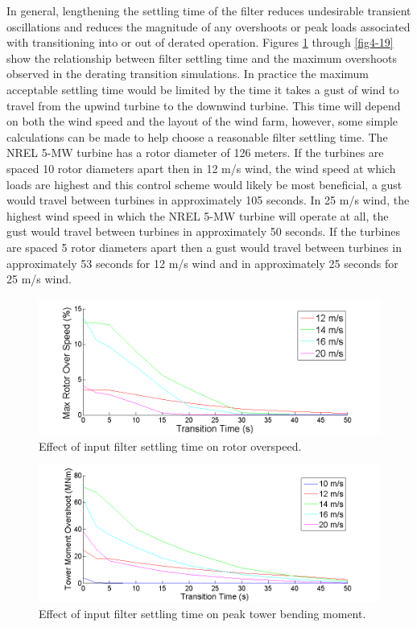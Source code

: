 In general, lengthening the settling time of the filter reduces undesirable transient oscillations and reduces the magnitude of any overshoots or peak loads associated with transitioning into or out of derated operation. Figures \ref{fig4-17} through \ref{fig4-19} show the relationship between filter settling time and the maximum overshoots observed in the derating transition simulations. In practice the maximum acceptable settling time would be limited by the time it takes a gust of wind to travel from the upwind turbine to the downwind turbine. This time will depend on both the wind speed and the layout of the wind farm, however, some simple calculations can be made to help choose a reasonable filter settling time. The NREL 5-MW turbine has a rotor diameter of 126 meters. If the turbines are spaced 10 rotor diameters apart then in 12 m/s wind, the wind speed at which loads are highest and this control scheme would likely be most beneficial, a gust would travel between turbines in approximately 105 seconds. In 25 m/s wind, the highest wind speed in which the NREL 5-MW turbine will operate at all, the gust would travel between turbines in approximately 50 seconds. If the turbines are spaced 5 rotor diameters apart then a gust would travel between turbines in approximately 53 seconds for 12 m/s wind and in approximately 25 seconds for 25 m/s wind. 


\begin{figure}[htb]
	\centering
		\includegraphics[width = \linewidth]{Figures/ch4Figures/fig4-17.png}
		
	\caption{Effect of input filter settling time on rotor overspeed.}
	\label{fig4-17}
\end{figure}

\begin{figure}[htb]
	\centering
		\includegraphics[width = \linewidth]{Figures/ch4Figures/fig4-18.png}
		
	\caption{Effect of input filter settling time on peak tower bending moment.}
	\label{fig4-18}
\end{figure}

